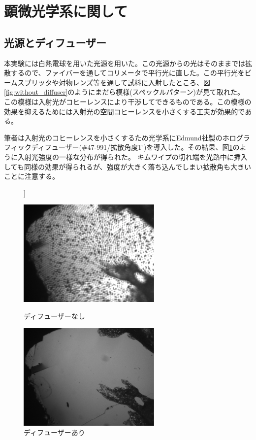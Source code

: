 \documentclass[11pt,a4paper]{jsarticle}
\begin{document}
\newpage
\appendix
\section{顕微光学系に関して}
\subsection{光源とディフューザー}
本実験には白熱電球を用いた光源を用いた。この光源からの光はそのままでは拡散するので、ファイバーを通してコリメータで平行光に直した。この平行光をビームスプリッタや対物レンズ等を通して試料に入射したところ、図\ref{fig:without_diffuser}のようにまだら模様(スペックルパターン)が見て取れた。
この模様は入射光がコヒーレンスにより干渉してできるものである。この模様の効果を抑えるためには入射光の空間コヒーレンスを小さくする工夫が効果的である。

筆者は入射光のコヒーレンスを小さくするため光学系にEdmund社製のホログラフィックディフューザー(\#47-991/拡散角度$1^\circ$)を導入した。その結果、図\ref{fig:with_diffuser}のように入射光強度の一様な分布が得られた。
キムワイプの切れ端を光路中に挿入しても同様の効果が得られるが、強度が大きく落ち込んでしまい拡散角も大きいことに注意する。
\begin{figure}[p]]
 \begin{minipage}{0.5\hsize}
  \begin{center}
   \includegraphics[width=70mm]{without_diffuser.eps}
  \end{center}
  \caption{ディフューザーなし}
  \label{fig:without_diffuser}
 \end{minipage}
 \begin{minipage}{0.5\hsize}
  \begin{center}
   \includegraphics[width=70mm]{with_diffuser.eps}
  \end{center}
  \caption{ディフューザーあり}
  \label{fig:with_diffuser}
 \end{minipage}
\end{figure}
\end{document}
